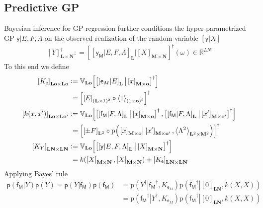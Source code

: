 \documentclass[preprint,12pt]{elsarticle}
\newcommand*{\M}[1]{\ensuremath{#1}\xspace}
\newcommand*{\x}{\times}
\newcommand*{\mi}[1]{\mathbf{#1}}
\newcommand*{\st}[1]{\mathbb{#1}}
\newcommand*{\rv}[1]{\mathsf{#1}}
\newcommand*{\te}[2][]{\left\lbrack{#2}\right\rbrack_{#1}}
\newcommand*{\diag}[2][]{\left\langle{#2}\right\rangle_{#1}}
\newcommand*{\prob}[3]{\M{\mathrm{p}\!\left(\left.{#1}\right\vert{#2,#3}\right)}}
\newcommand*{\deq}{\M{\mathrel{\mathop:}=}}
\newcommand*{\cov}[3][]{\ifthenelse{\equal{#1}{}}{\mathbb{V}_{#3}\!\left\lbrack{#2}\right\rbrack}{\mathbb{V}_{#3}\!\left\lbrack{#2,#1}\right\rbrack}}
\begin{document}
    \subsection{Predictive GP} \label{sub:GPR:Predictive}
        Bayesian inference for GP regression further conditions the hyper-parametrized GP $\rv{y} \vert E,F,\Lambda$ on the observed realization of the random variable $\te{\rv{y}\vert X}$
        \begin{equation*}
            \te[\mi{L} \x \mi{N}]{Y}^{\dagger} \deq \te{\te[\mi{L}]{\rv{y_M}\vert E,F,\Lambda} \big\vert \te[\mi{M}\x\mi{N}]{X}}^{\dagger}\!(\omega) \in \st{R}^{LN}
        \end{equation*}
        To this end we define
        \begin{equation} \label{def:GPR:Kk}
            \begin{aligned}
                \te[\mi{Lo}\x\mi{Lo}]{K_{\rv{e}}} &\deq 
                \cov{\te{\te[\mi{L}]{\rv{e}_{M}\vert E} \big\vert \te[\mi{M}\x\mi{o}]{x}}^{\dagger}}{\mi{Lo}} \\
                &\phantom{:}= \te{\te[(\mi{L}\x 1)^2]{E} \circ \diag[(1\x\mi{o})^2]{1}}^{\dagger} \\
                \te[\mi{Lo}\x\mi{L o^{\prime}}]{k(x, x^{\prime})} &\deq
                \cov[{\te{\te[\mi{L}]{\rv{f_M}\vert F,\Lambda} \big\vert \te[\mi{M}\x\mi{o^{\prime}}]{x^{\prime}}}^{\dagger}}]
                {\te{\te[\mi{L}]{\rv{f_M}\vert F,\Lambda} \big\vert \te[\mi{M}\x\mi{o}]{x}}^{\dagger}}{\mi{Lo}} \\
                &\phantom{:}= \te{\te[\mi{L}^{2}]{\pm F} \circ 
                \prob{\te[\mi{M}\x\mi{o}]{x}}{\te[\mi{M}\x\mi{o^{\prime}}]{x^{\prime}}}
                {\diag[\mi{L}^{2}\x\mi{M}^{2}]{\Lambda^{2}}}}^{\dagger} \\
                \te[\mi{LN}\x\mi{LN}]{K_{Y}} &\deq 
                \cov{\te{\te[\mi{L}]{\rv{y}\vert E,F,\Lambda} \big\vert \te[\mi{M}\x\mi{N}]{X}}^{\dagger}}{\mi{Lo}} \\
                &\phantom{:}= k(\te[\mi{M}\x\mi{N}]{X},\te[\mi{M}\x\mi{N}]{X}) + \te[\mi{LN}\x\mi{LN}]{K_{\rv{e}}}
            \end{aligned}
        \end{equation}
        Applying Bayes' rule
        \begin{equation*}
            \begin{aligned}
                \mathsf{p}(\rv{f_M}\vert Y)\mathsf{p}(Y) = \mathsf{p}(Y\vert \rv{f_M})\mathsf{p}(\rv{f_M})
                &= \prob{Y^{\dagger}}{\rv{f_M}^{\dagger}}{K_{\rv{e}_{M}}} \prob{\rv{f_M}^{\dagger}}{\te[\mi{LN}]{0}}{k(X,X)} \\
                &= \prob{\rv{f_M}^{\dagger}}{Y^{\dagger}}{K_{\rv{e}_{M}}} \prob{\rv{f_M}^{\dagger}}{\te[\mi{LN}]{0}}{k(X,X)}
            \end{aligned}
        \end{equation*}
\end{document}
